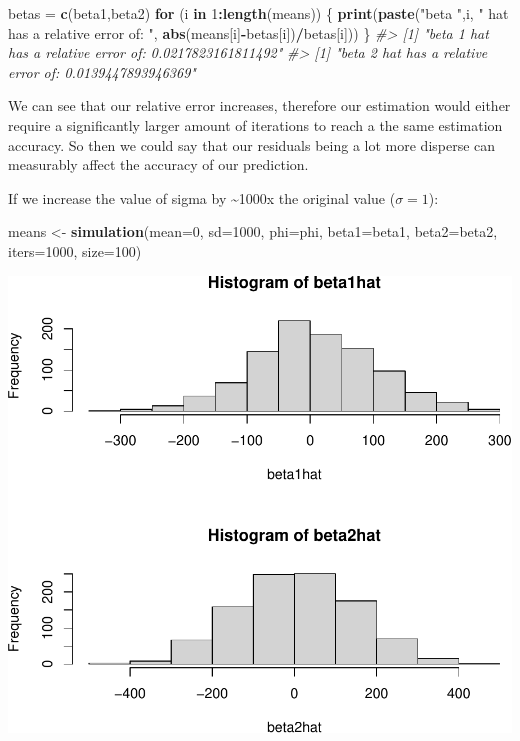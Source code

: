 \documentclass[]{article}
\newenvironment{Shaded}{\begin{snugshade}}{\end{snugshade}}
\newcommand{\CommentTok}[1]{\textcolor[rgb]{0.56,0.35,0.01}{\textit{#1}}}
\newcommand{\ControlFlowTok}[1]{\textcolor[rgb]{0.13,0.29,0.53}{\textbf{#1}}}
\newcommand{\DataTypeTok}[1]{\textcolor[rgb]{0.13,0.29,0.53}{#1}}
\newcommand{\DecValTok}[1]{\textcolor[rgb]{0.00,0.00,0.81}{#1}}
\newcommand{\KeywordTok}[1]{\textcolor[rgb]{0.13,0.29,0.53}{\textbf{#1}}}
\newcommand{\NormalTok}[1]{#1}
\newcommand{\OperatorTok}[1]{\textcolor[rgb]{0.81,0.36,0.00}{\textbf{#1}}}
\newcommand{\StringTok}[1]{\textcolor[rgb]{0.31,0.60,0.02}{#1}}
\begin{document}
\begin{Shaded}
\begin{Highlighting}[]
\NormalTok{betas =}\StringTok{ }\KeywordTok{c}\NormalTok{(beta1,beta2)}
\ControlFlowTok{for}\NormalTok{ (i }\ControlFlowTok{in} \DecValTok{1}\OperatorTok{:}\KeywordTok{length}\NormalTok{(means)) \{}
    \KeywordTok{print}\NormalTok{(}\KeywordTok{paste}\NormalTok{(}\StringTok{"beta "}\NormalTok{,i, }\StringTok{" hat has a relative error of: "}\NormalTok{, }\KeywordTok{abs}\NormalTok{(means[i]}\OperatorTok{-}\NormalTok{betas[i])}\OperatorTok{/}\NormalTok{betas[i]))}
\NormalTok{\}}
\CommentTok{#> [1] "beta  1  hat has a relative error of:  0.0217823161811492"}
\CommentTok{#> [1] "beta  2  hat has a relative error of:  0.0139447893946369"}
\end{Highlighting}
\end{Shaded}

We can see that our relative error increases, therefore our estimation
would either require a significantly larger amount of iterations to
reach a the same estimation accuracy. So then we could say that our
residuals being a lot more disperse can measurably affect the accuracy
of our prediction.

\newpage

If we increase the value of sigma by \textasciitilde{}1000x the original
value (\(\sigma = 1\)):

\begin{Shaded}
\begin{Highlighting}[]
\NormalTok{means <-}\StringTok{ }\KeywordTok{simulation}\NormalTok{(}\DataTypeTok{mean=}\DecValTok{0}\NormalTok{, }\DataTypeTok{sd=}\DecValTok{1000}\NormalTok{, }\DataTypeTok{phi=}\NormalTok{phi, }\DataTypeTok{beta1=}\NormalTok{beta1, }\DataTypeTok{beta2=}\NormalTok{beta2, }\DataTypeTok{iters=}\DecValTok{1000}\NormalTok{, }\DataTypeTok{size=}\DecValTok{100}\NormalTok{)}
\end{Highlighting}
\end{Shaded}

\includegraphics{./figures/unnamed-chunk-10-1.pdf}
\end{document}
